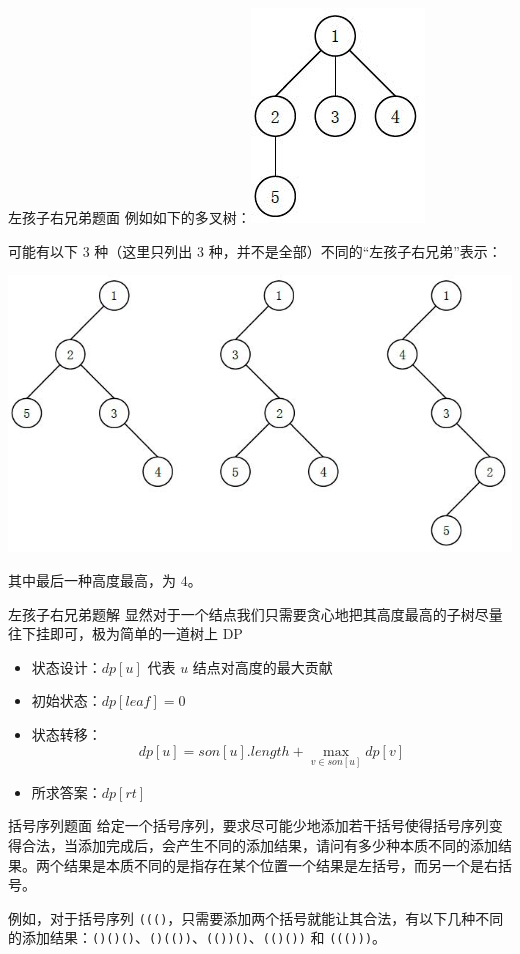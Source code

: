 \documentclass{pptt}
\begin{document}
\begin{frame}{左孩子右兄弟}{题面}
    例如如下的多叉树：\includegraphics[scale=0.4]{images/1.jpg}

    可能有以下 3 种（这里只列出 3 种，并不是全部）不同的“左孩子右兄弟”表示：

    \includegraphics[scale=0.4]{images/2.jpg}

    其中最后一种高度最高，为 $4$。
\end{frame}

\begin{frame}{左孩子右兄弟}{题解}
    显然对于一个结点我们只需要贪心地把其高度最高的子树尽量往下挂即可，极为简单的一道树上 DP

    \begin{itemize}
        \item 状态设计：$dp[u]$ 代表 $u$ 结点对高度的最大贡献
        \item 初始状态：$dp[leaf]=0$
        \item 状态转移：$$dp[u]=son[u].length + \max_{v \in son[u]}dp[v]$$
        \item 所求答案：$dp[rt]$
    \end{itemize}
\end{frame}

\begin{frame}{括号序列}{题面}
    给定一个括号序列，要求尽可能少地添加若干括号使得括号序列变得合法，当添加完成后，会产生不同的添加结果，请问有多少种本质不同的添加结果。两个结果是本质不同的是指存在某个位置一个结果是左括号，而另一个是右括号。

    例如，对于括号序列 \texttt{((()}，只需要添加两个括号就能让其合法，有以下几种不同的添加结果：\texttt{()()()}、\texttt{()(())}、\texttt{(())()}、\texttt{(()())} 和 \texttt{((()))}。
\end{frame}
\end{document}
